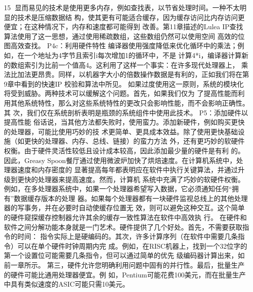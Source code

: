                                                   15
显而易见的技术是使用更多内存，例如查找表，以节省处理时间。一种不太明显的技术是压缩数据结
构，使其更有可能适合缓存，因为缓存访问比内存访问更便宜；在这种情况下，内存和速度都可能得到
改善。第11章描述的Lulea IP查找算法使用了这一思想，通过使用稀疏数组，这些数组仍然可以使用空间
高效的位图高效查找。
P4c：利用硬件特性
编译器使用强度降低来优化循环中的乘法；例如，在一个地址为4字节且索引i每次增加1的循环中，不是
计算4*i，编译器计算新的数组索引为比前一个值高4。这利用了这样一个事实：在许多现代处理器上，
乘法比加法更昂贵。同样，以机器字大小的倍数操作数据是有利的，正如我们将在第9章中看到的快速IP
校验和算法中所见。
如果过度使用这一原则，系统的模块化将受到威胁。两种技术可以缓解这个问题。首先，如果我们仅为
了提高性能而利用其他系统特性，那么对这些系统特性的更改只会影响性能，而不会影响正确性。其
次，我们仅在系统剖析表明是瓶颈的系统组件中使用此技术。
P5：添加硬件以提高性能
俗话说，当其他方法都失败时，使用蛮力。添加新硬件，例如购买更快的处理器，可能比使用巧妙的技
术更简单、更具成本效益。除了使用更快基础设施（如更快的处理器、内存、总线、链接）的蛮力方法
外，还有更巧妙的软硬件权衡。由于硬件灵活性较低且设计成本较高，因此添加最少量的硬件是有利
的。
因此，Greasy Spoon餐厅通过使用微波炉加快了烘焙速度。在计算机系统中，处理器速度和内存密度的
显著提高每年都表明应在软件中执行关键算法，并通过升级到更快的处理器来提高速度。然而，计算机
系统中充满了巧妙的软硬件权衡。
例如，在多处理器系统中，如果一个处理器希望写入数据，它必须通知任何“拥有”数据缓存版本的处理
器。如果每个处理器都有一块硬件监视总线上的其他处理器的写事务，并在必要时自动使缓存位置无
效，则可以避免这种交互。这个简单的硬件窥探缓存控制器允许其余的缓存一致性算法在软件中高效执
行。
在硬件和软件之间分解功能本身就是一门艺术。硬件提供了几个好处。首先，不需要获取指令的时间：
指令实际上是硬编码的。其次，许多计算序列（在软件中需要几条指令）可以在单个硬件时钟周期内完
成。例如，在RISC机器上，找到一个32位字的第一个设置位可能需要几条指令，但可以通过简单的优先
级编码器计算出来，如前一章所示。
第三，硬件允许您明确利用问题中固有的并行性。最后，批量生产的硬件可能比通用处理器便宜。例
如，Pentium可能花费100美元，而在批量生产中具有类似速度的ASIC可能只需10美元。


